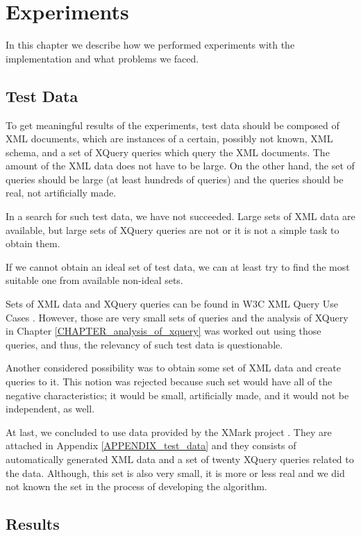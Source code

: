 \chapter{Experiments} \label{CHAPTER_experiments}
In this chapter we describe how we performed experiments with the implementation and what problems we faced.

\section{Test Data}
To get meaningful results of the experiments, test data should be composed of XML documents, which are instances of a certain, possibly not known, XML schema, and a set of XQuery queries which query the XML documents. The amount of the XML data does not have to be large. On the other hand, the set of queries should be large (at least hundreds of queries) and the queries should be real, not artificially made.

In a search for such test data, we have not succeeded. Large sets of XML data are available, but large sets of XQuery queries are not or it is not a simple task to obtain them.

If we cannot obtain an ideal set of test data, we can at least try to find the most suitable one from available non-ideal sets.

Sets of XML data and XQuery queries can be found in W3C XML Query Use Cases \cite{Marchiori:07:XQU}. However, those are very small sets of queries and the analysis of XQuery in Chapter \ref{CHAPTER_analysis_of_xquery} was worked out using those queries, and thus, the relevancy of such test data is questionable.

Another considered possibility was to obtain some set of XML data and create queries to it. This notion was rejected because such set would have all of the negative characteristics; it would be small, artificially made, and it would not be independent, as well.

At last, we concluded to use data provided by the XMark project \cite{xmark}. They are attached in Appendix \ref{APPENDIX_test_data} and they consists of automatically generated XML data and a set of twenty XQuery queries related to the data. Although, this set is also very small, it is more or less real and we did not known the set in the process of developing the algorithm.

\section{Results}

